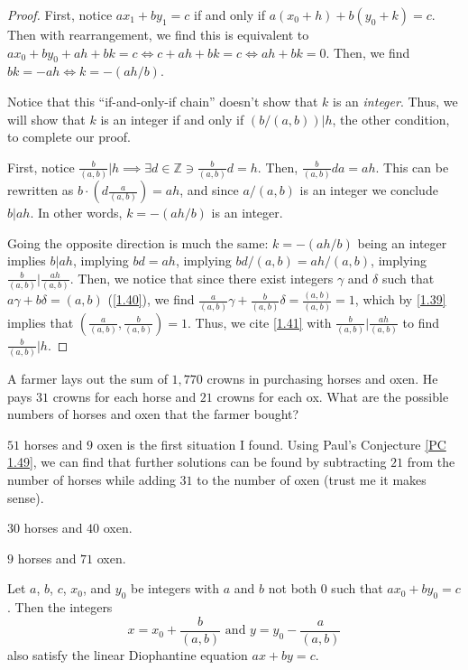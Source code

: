 \documentclass[../main.tex]{subfiles}
\begin{document}
\begin{proof}
  First, notice $ax_1 + by_1 = c$ if and only if $a(x_0 + h) + b(y_0 + k) = c$. Then with rearrangement, we find this is equivalent to $ax_0 + by_0 + ah + bk = c \iff c + ah + bk = c \iff ah + bk = 0$. Then, we find $bk = -ah \iff k = -(ah/b)$.

  Notice that this ``if-and-only-if chain'' doesn't show that $k$ is an \emph{integer}. Thus, we will show that $k$ is an integer if and only if $(b / (a, b)) | h$, the other condition, to complete our proof.

  First, notice $\frac{b}{(a,b)} | h \implies \exists d \in \mathbb{Z} \ni \frac{b}{(a, b)} d = h$. Then, $\frac{b}{(a, b)} da = ah$. This can be rewritten as $b \cdot (d \frac{a}{(a,b)}) = ah$, and since $a / (a,b)$ is an integer we conclude $b | ah$. In other words, $k = - (ah / b)$ is an integer.

  Going the opposite direction is much the same: $k = - (ah / b)$ being an integer implies $b | ah$, implying $bd = ah$, implying $bd / (a, b) = ah / (a, b)$, implying $\frac{b}{(a,b)} | \frac{ah}{(a,b)}$.
  Then, we notice that since there exist integers $\gamma$ and $\delta$ such that $a\gamma + b\delta = (a,b)$ (\ref{1.40}), we find $\frac{a}{(a,b)} \gamma + \frac{b}{(a,b)} \delta = \frac{(a,b)}{(a,b)} = 1$, which by \ref{1.39} implies that $(\frac{a}{(a,b)}, \frac{b}{(a,b)}) = 1$.
  Thus, we cite \ref{1.41} with $\frac{b}{(a,b)} | \frac{ah}{(a,b)}$ to find $\frac{b}{(a,b)} | h$.
\end{proof}



\begin{ex} \label{1.50}
  A farmer lays out the sum of $1,770$ crowns in purchasing horses and oxen. He pays $31$ crowns for each horse and $21$ crowns for each ox. What are the possible numbers of horses and oxen that the farmer bought?
\end{ex}

$51$ horses and $9$ oxen is the first situation I found. Using Paul's Conjecture \ref{PC 1.49}, we can find that further solutions can be found by subtracting $21$ from the number of horses while adding $31$ to the number of oxen (trust me it makes sense).

$30$ horses and $40$ oxen.

$9$ horses and $71$ oxen.



\begin{thm} \label{1.51}
  Let $a$, $b$, $c$, $x_0$, and $y_0$ be integers with $a$ and $b$ not both $0$ such that $ax_0 + by_0 = c$. Then the integers
  $$x = x_0 + \frac{b}{(a, b)} \mbox{ and } y = y_0 - \frac{a}{(a,b)}$$
  also satisfy the linear Diophantine equation $ax + by = c$.
\end{thm}
\end{document}
